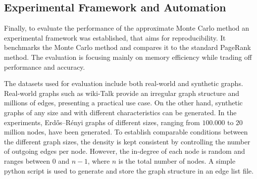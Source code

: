 \subsection{Experimental Framework and Automation}


Finally, to evaluate the performance of the approximate Monte Carlo method an experimental framework was established, that aims for reproducibility. It benchmarks the Monte Carlo method and compares it to the standard PageRank method. The evaluation is focusing mainly on memory efficiency while trading off performance and accuracy. \par
The datasets used for evaluation include both real-world and synthetic graphs. Real-world graphs such as wiki-Talk provide an irregular graph structure and millions of edges, presenting a practical use case. On the other hand, synthetic graphs of any size and with different characteristics can be generated. In the experiments, Erdős–Rényi graphs of different sizes, ranging from $100.000$ to $20$ million nodes, have been generated. To establish comparable conditions between the different graph sizes, the density is kept consistent by controlling the number of outgoing edges per node. However, the in-degree of each node is random and ranges between $0$ and $n-1$, where $n$ is the total number of nodes. A simple python script is used to generate and store the graph structure in an edge list file.

